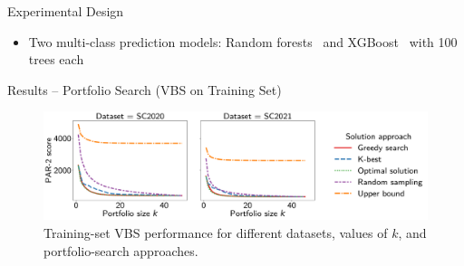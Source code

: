\documentclass[en]{sdqbeamer}
\begin{document}
\begin{frame}[t]{Experimental Design}
\begin{itemize}
		\pause
		\vspace{\baselineskip}
		\item Two multi-class prediction models: Random forests~\cite{breiman2001random, scikit-learn} and XGBoost~\cite{xgboost} with 100 trees each
	\end{itemize}
\end{frame}

\begin{frame}[t]{Results -- Portfolio Search (VBS on Training Set)}
	\begin{figure}[htb]
		\centering
		\includegraphics[width=\textwidth]{plots/search-train-objective.pdf}
		\caption*{Training-set VBS performance for different datasets, values of $k$, and portfolio-search approaches.}
	\end{figure}
\end{frame}
\end{document}
